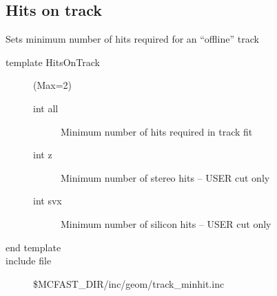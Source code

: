 
\subsection{Hits on track}  

Sets minimum number of hits required for an ``offline'' track

\begin{description}
\item[{\rm template} HitsOnTrack](Max=2)
\begin{description}
\item[{\rm  int} all]    Minimum number of hits required in track fit 
\item[{\rm  int} z]      Minimum number of stereo hits  --  USER cut only
\item[{\rm  int} svx]    Minimum number of silicon hits --  USER cut only
\end{description}
\item[end template]
\item[include file] \$MCFAST\_DIR/inc/geom/track\_minhit.inc
\end{description}

\filbreak

